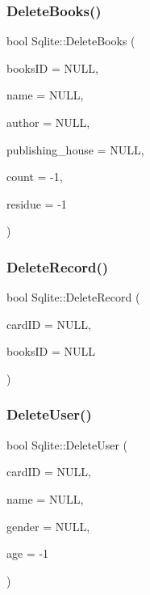 \mbox{\label{class_sqlite_a8a83c22e036086edf84758fb0f6cfc56}} 
\subsubsection{\texorpdfstring{DeleteBooks()}{DeleteBooks()}}
{\footnotesize\ttfamily bool Sqlite\+::\+Delete\+Books (\begin{DoxyParamCaption}\item[{Q\+String}]{books\+ID = {\ttfamily NULL},  }\item[{Q\+String}]{name = {\ttfamily NULL},  }\item[{Q\+String}]{author = {\ttfamily NULL},  }\item[{Q\+String}]{publishing\+\_\+house = {\ttfamily NULL},  }\item[{int}]{count = {\ttfamily -\/1},  }\item[{int}]{residue = {\ttfamily -\/1} }\end{DoxyParamCaption})}

\mbox{\label{class_sqlite_aa120de86db20f42a61a5c2eae9ad6b89}} 
\subsubsection{\texorpdfstring{DeleteRecord()}{DeleteRecord()}}
{\footnotesize\ttfamily bool Sqlite\+::\+Delete\+Record (\begin{DoxyParamCaption}\item[{Q\+String}]{card\+ID = {\ttfamily NULL},  }\item[{Q\+String}]{books\+ID = {\ttfamily NULL} }\end{DoxyParamCaption})}

\mbox{\label{class_sqlite_af2b581d800d01e1f1281d98ec1341ddd}} 
\subsubsection{\texorpdfstring{DeleteUser()}{DeleteUser()}}
{\footnotesize\ttfamily bool Sqlite\+::\+Delete\+User (\begin{DoxyParamCaption}\item[{Q\+String}]{card\+ID = {\ttfamily NULL},  }\item[{Q\+String}]{name = {\ttfamily NULL},  }\item[{Q\+String}]{gender = {\ttfamily NULL},  }\item[{int}]{age = {\ttfamily -\/1} }\end{DoxyParamCaption})}

